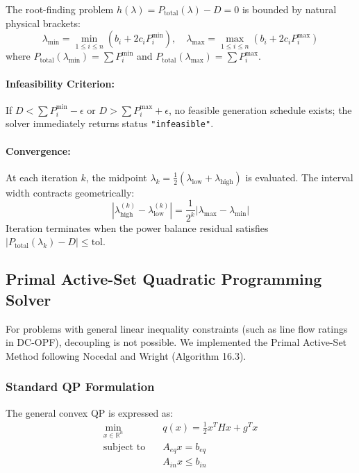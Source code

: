 The root-finding problem $h(\lambda) = P_{\text{total}}(\lambda) - D = 0$ is bounded by natural physical brackets:
\begin{equation}
    \lambda_{\min} = \min_{1 \le i \le n} \left( b_i + 2 c_i P_i^{\min} \right), \quad \lambda_{\max} = \max_{1 \le i \le n} \left( b_i + 2 c_i P_i^{\max} \right)
\end{equation}
where $P_{\text{total}}(\lambda_{\min}) = \sum P_i^{\min}$ and $P_{\text{total}}(\lambda_{\max}) = \sum P_i^{\max}$.

\paragraph{Infeasibility Criterion:} If $D < \sum P_i^{\min} - \epsilon$ or $D > \sum P_i^{\max} + \epsilon$, no feasible generation schedule exists; the solver immediately returns status \texttt{"infeasible"}.

\paragraph{Convergence:} At each iteration $k$, the midpoint $\lambda_k = \frac{1}{2}(\lambda_{\text{low}} + \lambda_{\text{high}})$ is evaluated. The interval width contracts geometrically:
\begin{equation}
    |\lambda_{\text{high}}^{(k)} - \lambda_{\text{low}}^{(k)}| = \frac{1}{2^k} |\lambda_{\max} - \lambda_{\min}|
\end{equation}
Iteration terminates when the power balance residual satisfies $|P_{\text{total}}(\lambda_k) - D| \le \text{tol}$.

\subsection{Primal Active-Set Quadratic Programming Solver}

For problems with general linear inequality constraints (such as line flow ratings in DC-OPF), decoupling is not possible. We implemented the Primal Active-Set Method following Nocedal and Wright \cite{nocedal2006} (Algorithm 16.3).

\subsubsection{Standard QP Formulation}
The general convex QP is expressed as:
\begin{align}
    \min_{x \in \mathbb{R}^n} \quad & q(x) = \frac{1}{2} x^T H x + g^T x \\
    \text{subject to} \quad & A_{eq} x = b_{eq} \\
    & A_{in} x \le b_{in}
\end{align}

